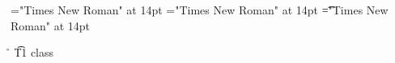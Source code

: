 \font\vxt="Times New Roman" at 14pt
\font\xt="Times New Roman" at 14pt
\font\t="Times New Roman" at 14pt
 \r\n
\t{T1 class }




\bye
